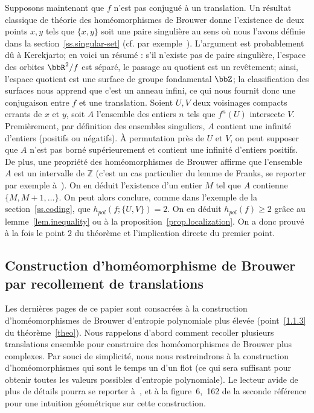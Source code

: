 Supposons maintenant que $f$ n'est pas conjugué à un translation. Un résultat classique de théorie des homéomorphismes de Brouwer donne l'existence de deux points $x,y$ tels que $\{x,y\}$ soit une paire singulière au sens où nous l'avons définie dans la section~\ref{ss.singular-set} (cf. par exemple~\cite{Nak95b}). L'argument est probablement dû à Kerekjarto; en voici un résumé : s'il n'existe pas de paire singulière, l'espace des orbites $\bbR^2/f$ est séparé, le {passage au quotient} est un revêtement; ainsi, l'espace quotient est une surface de groupe fondamental $\bbZ$; la classification des surfaces nous apprend que c'est un anneau infini, ce qui nous fournit donc une conjugaison entre $f$ et une translation. Soient $U,V$ deux voisinages compacts errants de $x$ et $y$, soit $A$ l'ensemble des entiers $n$ tels que $f^n(U)$ intersecte $V$. Premièrement, par définition des ensembles singuliers, $A$ contient une infinité d'entiers (positifs ou négatifs). \`A permutation près de $U$ et $V$, on peut supposer que $A$ n'est pas borné supérieurement et contient une infinité d'entiers positifs. De plus, une propriété des homéomorphismes de Brouwer affirme que l'ensemble $A$ est un intervalle de $\mathbb Z$ (c'est un cas particulier du lemme de Franks, se reporter par exemple à~\cite[Lemma~7]{Ler99}). On en déduit l'existence d'un entier $M$ tel que $A$ contienne $\{M,M+1, \dots \}$. On peut alors conclure, comme dans l'exemple de la section~\ref{ss.coding}, que $h_{pol}(f;\{U,V\}) = 2$. {On en déduit $h_{pol}(f) \geq 2$ grâce au lemme~\ref{lem.inequality} ou à la proposition~\ref{prop.localization}}. On a donc prouvé à la fois le point $2$ du théorème et l'implication directe du premier point.

\subsection{Construction d'homéomorphisme de Brouwer par recollement de translations}\label{ss.recollement}

Les dernières pages de ce papier sont consacrées à la construction d'homéomorphismes de Brouwer d'entropie polynomiale plus élevée (point~\eqref{1.1.3} du théorème~\ref{theo}). {Nous rappelons d'abord comment recoller plusieurs translations ensemble pour construire des homéomorphismes de Brouwer plus complexes.} Par souci de simplicité, nous nous restreindrons à la construction d'homéomorphismes qui sont {le temps un d'un flot} (ce qui sera suffisant pour obtenir toutes les valeurs possibles d'entropie polynomiale). Le lecteur avide de plus de détails pourra se reporter à~\cite{Nak95,BegLer03}, et à la figure~6,~162 de la seconde référence pour une intuition géométrique sur cette construction.


